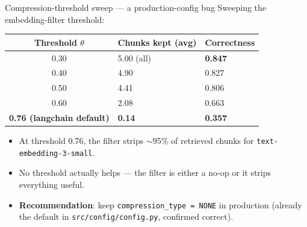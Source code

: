 \documentclass[10pt,aspectratio=169,xcolor={table}]{beamer}
\begin{document}
\begin{frame}{Compression-threshold sweep --- a production-config bug}
  Sweeping the embedding-filter threshold:
  \vspace{6pt}\centering\small
  \begin{tabularx}{0.7\textwidth}{cXX}
    \toprule
    Threshold $\theta$ & Chunks kept (avg) & Correctness \\
    \midrule
    \rowcolor{teal!10}
    0.30 & 5.00 (all) & \textbf{0.847} \\
    0.40 & 4.90       & 0.827 \\
    0.50 & 4.41       & 0.806 \\
    0.60 & 2.08       & 0.663 \\
    \rowcolor{red!8}
    \textbf{0.76 (langchain default)} & \textbf{0.14}  & \textbf{0.357} \\
    \bottomrule
  \end{tabularx}

  \vspace{6pt}
  \begin{itemize}\footnotesize
    \item At threshold 0.76, the filter strips $\sim$95\% of retrieved chunks
          for \texttt{text-embedding-3-small}.
    \item No threshold actually helps --- the filter is either a no-op
          or it strips everything useful.
    \item \textbf{Recommendation}: keep \texttt{compression\_type = NONE}
          in production (already the default in \texttt{src/config/config.py},
          confirmed correct).
  \end{itemize}
\end{frame}
\end{document}
